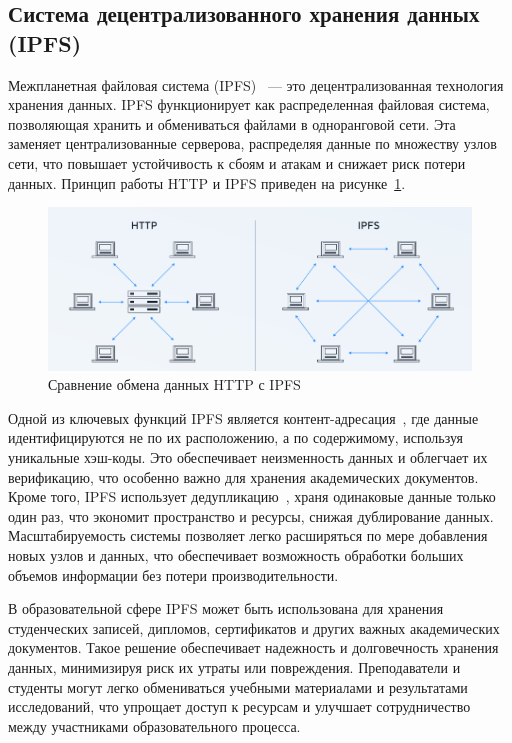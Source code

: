 \subsection{Система децентрализованного хранения данных (IPFS)}

Межпланетная файловая система (IPFS)~\cite{bib:ipfs, bib:ipfs_is} --- это децентрализованная технология хранения данных. IPFS функционирует как распределенная файловая система, позволяющая хранить и обмениваться файлами в одноранговой сети. Эта заменяет централизованные серверова, распределяя данные по множеству узлов сети, что повышает устойчивость к сбоям и атакам и снижает риск потери данных. Принцип работы HTTP и IPFS приведен на рисунке~\ref{fig:http_vs_ipfs}.

\begin{figure}[H]   
	\centering
	\includegraphics[width=.8\textwidth]{images/1.http_vs_ipfs.png}
	\parskip=6pt
	\caption{Сравнение обмена данных HTTP с IPFS}
	\label{fig:http_vs_ipfs}
\end{figure}

Одной из ключевых функций IPFS является контент-адресация~\cite{bib:ipfs_2}, где данные идентифицируются не по их расположению, а по содержимому, используя уникальные хэш-коды. Это обеспечивает неизменность данных и облегчает их верификацию, что особенно важно для хранения академических документов. Кроме того, IPFS использует дедупликацию~\cite{bib:dedup}, храня одинаковые данные только один раз, что экономит пространство и ресурсы, снижая дублирование данных. Масштабируемость системы позволяет легко расширяться по мере добавления новых узлов и данных, что обеспечивает возможность обработки больших объемов информации без потери производительности.

В образовательной сфере IPFS может быть использована для хранения студенческих записей, дипломов, сертификатов и других важных академических документов. Такое решение обеспечивает надежность и долговечность хранения данных, минимизируя риск их утраты или повреждения. Преподаватели и студенты могут легко обмениваться учебными материалами и результатами исследований, что упрощает доступ к ресурсам и улучшает сотрудничество между участниками образовательного процесса.

